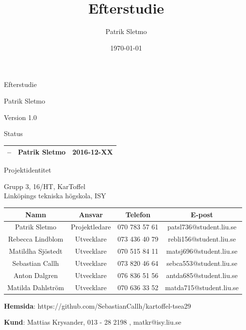 ﻿\documentclass{article}
\title{Efterstudie}
\author{Patrik Sletmo}
\date{\today}
\begin{document}
\thispagestyle{empty}

{
\sffamily
\centering
\large


{\huge 
Efterstudie
}

{\large
Patrik Sletmo
}

{\large
Version 1.0
}

\vspace{3.5cm}

Status
\begin{table}[H]
\centering
\begin{tabular}{ | c | c | c | }
\hline
-- & Patrik Sletmo & 2016-12-XX \\
\hline
\end{tabular}
\end{table}
}
\clearpage

\vspace*{\fill}
{
\sffamily
\centering
\large


{\huge
Projektidentitet
}

{\large
Grupp 3, 16/HT, KarToffel \\ Linköpings tekniska högskola, ISY
}

\vspace{0.5cm}

\begin{table}[H]
\centering
\begin{tabular}{ | c | c | c | c |}
\hline
Namn & Ansvar & Telefon & E-post \\
\hline
Patrik Sletmo & Projektledare & 070 783 57 61 & patsl736@student.liu.se \\
\hline
Rebecca Lindblom & Utvecklare & 073 436 40 79 & rebli156@student.liu.se \\
\hline
Matildha Sjöstedt & Utvecklare & 070 515 84 11 & matsj696@student.liu.se \\
\hline
Sebastian Callh & Utvecklare & 073 820 46 64 & sebca553@student.liu.se \\
\hline
Anton Dalgren & Utvecklare & 076 836 51 56 & antda685@student.liu.se \\
\hline
Matilda Dahlström & Utvecklare & 070 636 33 52 & matda715@student.liu.se \\
\hline
\end{tabular}
\end{table}
}

\begin{center}
\textbf{Hemsida}: https://github.com/SebastianCallh/kartoffel-tsea29
\end{center}

\begin{center}
\textbf{Kund}: Mattias Krysander, 013 - 28 2198 , matkr@isy.liu.se
\end{center}
\end{document}
